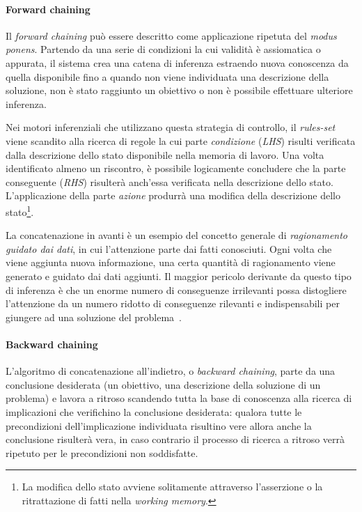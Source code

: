 \paragraph{Forward chaining}
Il \emph{forward chaining} può essere descritto come applicazione ripetuta del \emph{modus ponens}. Partendo da una serie di condizioni la cui validità è assiomatica o appurata, il sistema crea una catena di inferenza estraendo nuova conoscenza da quella disponibile fino a quando non viene individuata una descrizione della soluzione, non è stato raggiunto un obiettivo o non è possibile effettuare ulteriore inferenza.

Nei motori inferenziali che utilizzano questa strategia di controllo, il \emph{rules-set} viene scandito alla ricerca di regole la cui parte \emph{condizione} (\emph{LHS}) risulti verificata dalla descrizione dello stato disponibile nella memoria di lavoro. Una volta identificato almeno un riscontro, è possibile logicamente concludere che la parte conseguente (\emph{RHS}) risulterà anch'essa verificata nella descrizione dello stato. L'applicazione della parte \emph{azione} produrrà una modifica della descrizione dello stato\footnote{La modifica dello stato avviene solitamente attraverso l'asserzione o la ritrattazione di fatti nella \emph{working memory}.}.

La concatenazione in avanti è un esempio del concetto generale di \emph{ragionamento guidato dai dati}, in cui l'attenzione parte dai fatti conosciuti. Ogni volta che viene aggiunta nuova informazione, una certa quantità di ragionamento viene generato e guidato dai dati aggiunti. Il maggior pericolo derivante da questo tipo di inferenza è che un enorme numero di conseguenze irrilevanti possa distogliere l'attenzione da un numero ridotto di conseguenze rilevanti e indispensabili per giungere ad una soluzione del problema~\cite{russellnorvig2009}.

\paragraph{Backward chaining}
L'algoritmo di concatenazione all'indietro, o \emph{backward chaining}, parte da una conclusione desiderata (un obiettivo, una descrizione della soluzione di un problema) e lavora a ritroso scandendo tutta la base di conoscenza alla ricerca di implicazioni che verifichino la conclusione desiderata: qualora tutte le precondizioni dell'implicazione individuata risultino vere allora anche la conclusione risulterà vera, in caso contrario il processo di ricerca a ritroso verrà ripetuto per le precondizioni non soddisfatte.

